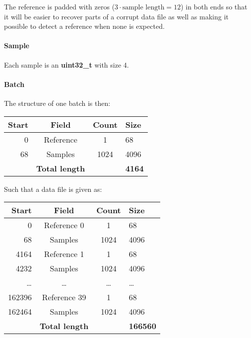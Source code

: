 \documentclass[a4paper]{article}
\begin{document}
\begin{multicols}{2}
  \vspace{1em}

  The reference is padded with zeros ($3 \cdot \text{sample length} =
  12$) in both ends so that it will be easier to
  recover parts of a corrupt data file as well as making it possible to
  detect a reference when none is expected.

  \paragraph{Sample}Each sample is an \textbf{uint32\_t} with size 4.

  \paragraph{Batch}The structure of one
  batch is then:
  \vspace{1em}

  \begin{tabular}{|r|c|c|l|}
    \hline
    \bfseries Start   &     \bfseries Field     &   \bfseries Count
    &   \bfseries Size \\ \hline
    0   & Reference & 1 & 68 \\ \hline
    68  & Samples   & 1024 & 4096 \\ \hline
    & \textbf{Total length} &  & \textbf{4164} \\ \hline
  \end{tabular}
  \label{tab:batch_binary_fields}

  \vspace{1em}
  Such that a data file is given as: \\
  \vspace{1em}

  \begin{tabular}{|r|c|c|l|}
    \hline
    \bfseries Start   &     \bfseries Field     &   \bfseries Count
    &   \bfseries Size  \\ \hline
    0   & Reference 0 & 1 & 68 \\ \hline
    68  & Samples   & 1024 & 4096 \\ \hline
    4164 & Reference 1 & 1 & 68 \\ \hline
    4232  & Samples   & 1024 & 4096 \\ \hline
    \dots & \dots & \dots & \dots \\ \hline
    162396 & Reference 39 & 1 & 68 \\ \hline
    162464 & Samples   & 1024 & 4096 \\ \hline
    & \textbf{Total length} &  & \textbf{166560} \\ \hline
  \end{tabular}
  \label{tab:data_binary_fields}



\end{multicols}
\end{document}
